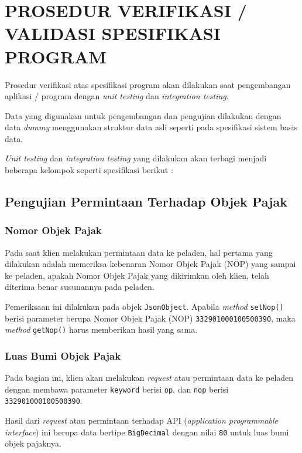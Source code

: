 \chapter{PROSEDUR VERIFIKASI / VALIDASI SPESIFIKASI PROGRAM}

Prosedur verifikasi atas spesifikasi program akan dilakukan saat pengembangan aplikasi / program dengan \textit{unit testing} dan \textit{integration testing}.

Data yang digunakan untuk pengembangan dan pengujian dilakukan dengan data \textit{dummy} menggunakan struktur data asli seperti pada spesifikasi sistem basis data.

\textit{Unit testing} dan \textit{integration testing} yang dilakukan akan terbagi menjadi beberapa kelompok seperti spesifikasi berikut :

\section{Pengujian Permintaan Terhadap Objek Pajak}

\subsection{Nomor Objek Pajak}

Pada saat klien melakukan permintaan data ke peladen, hal pertama yang dilakukan adalah memeriksa kebenaran Nomor Objek Pajak (NOP) yang sampai ke peladen, apakah Nomor Objek Pajak yang dikirimkan oleh klien, telah diterima benar susunannya pada peladen.

Pemeriksaan ini dilakukan pada objek \texttt{JsonObject}. Apabila \textit{method} \texttt{setNop()} berisi parameter berupa Nomor Objek Pajak (NOP) \texttt{332901000100500390}, maka \textit{method} \texttt{getNop()} harus memberikan hasil yang sama.

\subsection{Luas Bumi Objek Pajak}

Pada bagian ini, klien akan melakukan \textit{request} atau permintaan data ke peladen dengan membawa parameter \texttt{keyword} berisi \texttt{op}, dan \texttt{nop} berisi \texttt{332901000100500390}.	

Hasil dari \textit{request} atau permintaan terhadap API (\textit{application programmable interface}) ini berupa data bertipe \texttt{BigDecimal} dengan nilai \texttt{80} untuk luas bumi objek pajaknya.

